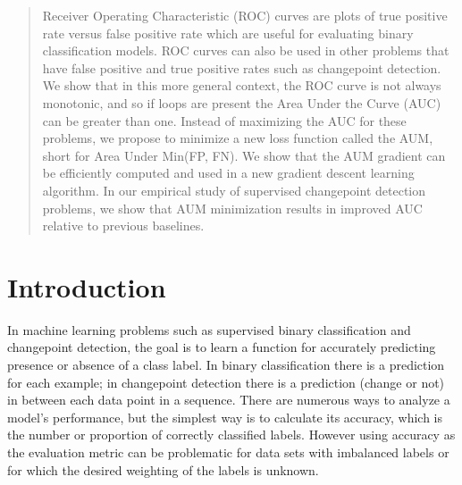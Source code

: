 \documentclass{article}
\begin{document}

\begin{abstract}
Receiver Operating Characteristic (ROC) curves are plots of true positive rate versus false positive rate which are useful for evaluating binary classification models.
ROC curves can also be used in other problems that have false positive and true positive rates such as changepoint detection.
We show that in this more general context, the ROC curve is not always monotonic, and so if loops are present the Area Under the Curve (AUC) can be greater than one.
Instead of maximizing the AUC for these problems, we propose to minimize a new loss function called the AUM, short for Area Under Min(FP, FN).
We show that the AUM gradient can be efficiently computed and used in a new gradient descent learning algorithm.
In our empirical study of supervised changepoint detection problems, we show that AUM minimization results in improved AUC relative to previous baselines.
\end{abstract}

\section{Introduction}
\label{sec:introduction}
In machine learning problems such as supervised binary classification and changepoint detection, the goal is to learn a function for accurately predicting presence or absence of a class label.
In binary classification there is a prediction for each example; in changepoint detection there is a prediction (change or not) in between each data point in a sequence.
There are numerous ways to analyze a model's performance, but the simplest way is to calculate its accuracy, which is the number or proportion of correctly classified labels.
However using accuracy as the evaluation metric can be problematic for data sets with imbalanced labels or for which the desired weighting of the labels is unknown.
\end{document}
